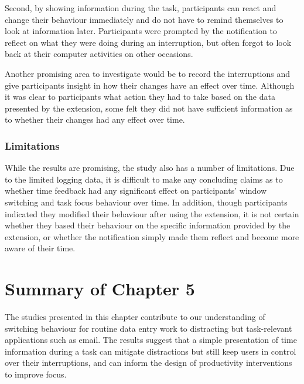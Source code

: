 Second, by showing information during the task, participants can react and change their behaviour immediately and do not have to remind themselves to look at information later. Participants were prompted by the notification to reflect on what they were doing during an interruption, but often forgot to look back at their computer activities on other occasions.

Another promising area to investigate would be to record the interruptions and give participants insight in how their changes have an effect over time. Although it was clear to participants what action they had to take based on the data presented by the extension, some felt they did not have sufficient information as to whether their changes had any effect over time.

\subsubsection{Limitations}
While the results are promising, the study also has a number of limitations. Due to the limited logging data, it is difficult to make any concluding claims as to whether time feedback had any significant effect on participants’ window switching and task focus behaviour over time. In addition, though participants indicated they modified their behaviour after using the extension, it is not certain whether they based their behaviour on the specific information provided by the extension, or whether the notification simply made them reflect and become more aware of their time. 

\section{Summary of Chapter 5}
The studies presented in this chapter contribute to our understanding of switching behaviour for routine data entry work to distracting but task-relevant applications such as email. The results suggest that a simple presentation of time information during a task can mitigate distractions but still keep users in control over their interruptions, and can inform the design of productivity interventions to improve focus. 
